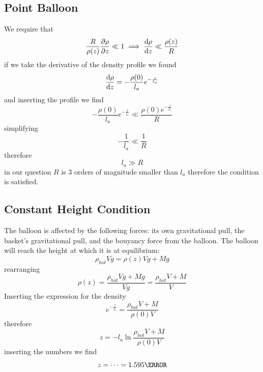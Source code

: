 \subsection{Point Balloon}
We require that
\begin{equation}
	\frac{R}{\rho(z)}\pdv{\rho}{z}\ll 1 \implies \dv{\rho}{z} \ll \frac{\rho(z)}{R}
\end{equation}
if we take the derivative of the density profile we found
\begin{equation}
	\dv{\rho}{z} = -\frac{\rho(0)}{l_a}e^{-\frac{z}{l_a}}
\end{equation}
and inserting the profile we find 
\begin{equation}
	-\frac{\rho(0)}{l_a}e^{-\frac{z}{l_a}} \ll \frac{\rho(0) e^{-\frac{z}{l_a}}}{R}
\end{equation}
simplifying
\begin{equation}
	-\frac{1}{l_a} \ll \frac{1}{R}
\end{equation}
therefore
\begin{equation}
	l_a \gg R
\end{equation}
in our question \(R\) is 3 orders of magnitude smaller than \(l_a\) therefore the condition is satisfied.
\subsection{Constant Height Condition}
The balloon is affected by the following forces: its own gravitational pull, the basket's gravitational pull, and the bouyancy force from the balloon. The balloon will reach the height at which it is at equilibrium:
\begin{equation}
	\rho_{hot} V g = \rho(z) V g + Mg
\end{equation}
rearranging
\begin{equation}
	\rho(z) = \frac{\rho_{hot} V g + Mg}{Vg} = \frac{\rho_{hot}V + M}{V}
\end{equation}
Inserting the expression for the density
\begin{equation}
	 e^{-\frac{z}{l_a}} = \frac{\rho_{hot}V + M}{\rho(0) V}
\end{equation}
therefore
\begin{equation}
	z = -l_a \ln{\frac{\rho_{hot}V + M}{\rho(0) V}}
\end{equation}
inserting the numbers we find
\begin{equation}
	z = \cdots = 1.595 \km
\end{equation}